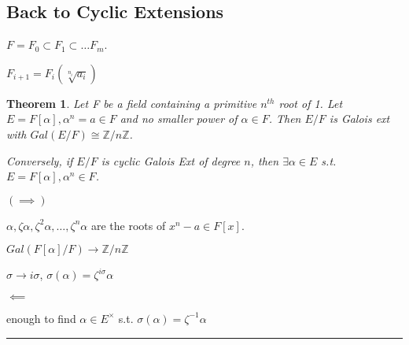 \documentclass[twoside]{article}
\newcounter{lecnum}
\newcommand{\Z}{\mathbb{Z}}
\newcommand{\z}{\zeta}
\renewcommand{\a}{\alpha}
\newtheorem{theorem}{Theorem}[lecnum]
\newenvironment{proof}{{\bf Proof:}}{\hfill\rule{2mm}{2mm}}
\begin{document}
\newpage

\subsection{Back to Cyclic Extensions}

$F = F_0 \subset F_1 \subset \dots F_m$.

$F_{i+1} = F_i(\sqrt[n_i]{a_i})$

\begin{theorem}
    Let F be a field containing a primitive $n^{th}$ root of 1. Let $E = F[\a], \a^n = a \in F$ and no smaller power of $\a \in F$. Then $E/F$ is Galois ext with $Gal(E/F) \cong \Z/n\Z$.

    Conversely, if $E/F$ is cyclic Galois Ext of degree $n$, then $\exists \alpha \in E$ s.t. $E = F[\a], \a^n \in F$. 
\end{theorem}

\begin{proof}
    $(\implies)$


    $\alpha, \zeta\alpha, \z^2\a, \dots, \z^n\a$ are the roots of $x^n - a \in F[x]$. 

    $Gal(F[\alpha]/F) \rightarrow \Z/n\Z$

    $\sigma \rightarrow i\sigma$, $\sigma(\alpha) = \z^{i\sigma}\alpha$

    $\impliedby$

    enough to find $\alpha \in E^\times$ s.t. $\sigma(\alpha) = \zeta^{-1}\alpha$

\end{proof}
\end{document}
